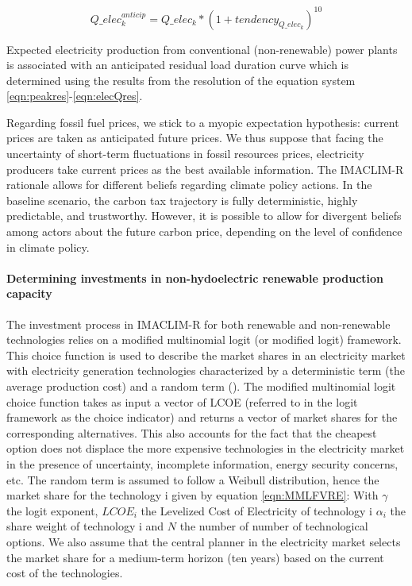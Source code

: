 {\begin{dmath}
    Q\_elec_k^{anticip} = Q\_elec_k * \left( 1 + tendency_{Q\_elec_k}\right) ^{10}
    \label{eqn:elecQAnticip}
\end{dmath}

Expected electricity production from conventional (non-renewable) power plants is associated with an anticipated residual load duration curve which is determined using the results from the resolution of the equation system \ref{eqn:peakres}-\ref{eqn:elecQres}.

Regarding fossil fuel prices, we stick to a myopic expectation hypothesis: current prices are taken as anticipated future prices. We thus suppose that facing the uncertainty of short-term fluctuations in fossil resources prices, electricity producers take current prices as the best available information. The IMACLIM-R rationale allows for different beliefs regarding climate policy actions. In the baseline scenario, the carbon tax trajectory is fully deterministic, highly predictable, and trustworthy. However, it is possible to allow for divergent beliefs among actors about the future carbon price, depending on the level of confidence in climate policy.

\paragraph{Determining investments in non-hydoelectric renewable production capacity}

The investment process in IMACLIM-R for both renewable and non-renewable technologies relies on a modified multinomial logit (or modified logit) framework. This choice function is used to describe the market shares in an electricity market with electricity generation technologies characterized by a deterministic term (the average production cost) and a random term (\cite{Clarke1993}). The modified multinomial logit choice function takes as input a vector of LCOE (referred to in the logit framework as the choice indicator) and returns a vector of market shares for the corresponding alternatives. This also accounts for the fact that the cheapest option does not displace the more expensive technologies in the electricity market in the presence of uncertainty, incomplete information, energy security concerns, etc. The random term is assumed to follow a Weibull distribution, hence the market share for the technology i given by equation \ref{eqn:MMLFVRE}:
With $\gamma$ the logit exponent, $LCOE_{i}$ the Levelized Cost of Electricity of technology i $\alpha_{i}$ the share weight of technology i and $N$ the number of number of technological options. 
We also assume that the central planner in the electricity market selects the market share for a medium-term horizon (ten years) based on the current cost of the technologies.


}
